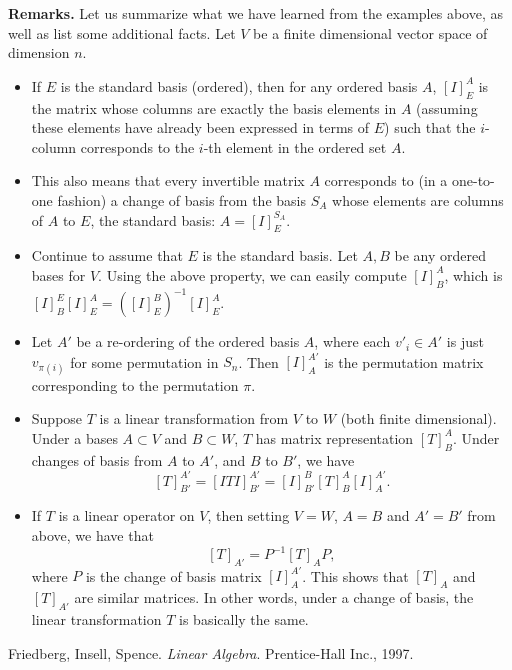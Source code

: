 \documentclass[12pt]{article}
\begin{document}
\textbf{Remarks.}  Let us summarize what we have learned from the examples above, as well as list some additional facts.  Let $V$ be a finite dimensional vector space of dimension $n$.  
\begin{itemize}
\item If $E$ is the standard basis (ordered), then for any ordered basis $A$, $[I]^A_E$ is the matrix whose columns are exactly the basis elements in $A$ (assuming these elements have already been expressed in terms of $E$) such that the $i$-column corresponds to the $i$-th element in the ordered set $A$.
\item This also means that every invertible matrix $A$ corresponds to (in a one-to-one fashion) a change of basis from the basis $S_A$ whose elements are columns of $A$ to $E$, the standard basis: $A=[I]^{S_A}_E$.
\item Continue to assume that $E$ is the standard basis.  Let $A,B$ be any ordered bases for $V$.  Using the above property, we can easily compute $[I]^A_B$, which is $[I]^E_B[I]^A_E=([I]^B_E)^{-1}[I]^A_E.$
\item Let $A'$ be a re-ordering of the ordered basis $A$, where each $v'_i\in A'$ is just $v_{\pi(i)}$ for some permutation in $S_n$.  Then $[I]^{A'}_A$ is the permutation matrix corresponding to the permutation $\pi$.
\item Suppose $T$ is a linear transformation from $V$ to $W$ (both finite dimensional).  Under a bases $A\subset V$ and $B\subset W$, $T$ has matrix representation $[T]^A_B$.  Under changes of basis from $A$ to $A'$, and $B$ to $B'$, we have $$[T]^{A'}_{B'}=[ITI]^{A'}_{B'}=[I]^B_{B'}[T]^A_B[I]^{A'}_A.$$ 
\item If $T$ is a linear operator on $V$, then setting $V=W$, $A=B$ and $A'=B'$ from above, we have that $$[T]_{A'}=P^{-1}[T]_A P,$$ where $P$ is the change of basis matrix $[I]^{A'}_A$.  This shows that $[T]_A$ and $[T]_{A'}$ are similar matrices.  In other words, under a change of basis, the linear transformation $T$ is basically the same.
\end{itemize}

\begin{thebibliography}{3}
 Friedberg, Insell, Spence. {\it Linear Algebra}. Prentice-Hall Inc., 1997.
\end{thebibliography}
\end{document}
